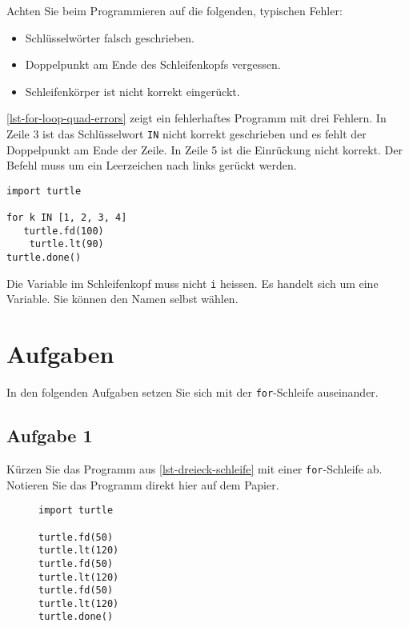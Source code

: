 Achten Sie beim Programmieren auf die folgenden, typischen Fehler:

\begin{itemize}
	\item Schlüsselwörter falsch geschrieben.
	\item Doppelpunkt am Ende des Schleifenkopfs vergessen.
	\item Schleifenkörper ist nicht korrekt eingerückt.
\end{itemize}
\autoref{lst-for-loop-quad-errors} zeigt ein fehlerhaftes Programm mit drei Fehlern. In Zeile 3 ist das Schlüsselwort \lstinline{IN} nicht korrekt geschrieben und es fehlt der Doppelpunkt am Ende der Zeile. In Zeile \num{5} ist die Einrückung nicht korrekt. Der Befehl muss um ein Leerzeichen nach links gerückt werden.

\begin{lstlisting}[caption={Fehlerhaftes Programm (\graybgtexttt{quadrat\_loop\_fehler.py}).}, label=lst-for-loop-quad-errors]
import turtle

for k IN [1, 2, 3, 4]
   turtle.fd(100)
    turtle.lt(90)
turtle.done()
\end{lstlisting}

\begin{hinweis}
Die Variable im Schleifenkopf muss nicht \lstinline{i} heissen. Es handelt sich um eine  Variable. Sie können den Namen selbst wählen.
\end{hinweis}

\section{Aufgaben}

In den folgenden Aufgaben setzen Sie sich mit der \lstinline{for}-Schleife auseinander.

\subsection{Aufgabe 1}

Kürzen Sie das Programm aus \autoref{lst-dreieck-schleife} mit einer \lstinline{for}-Schleife ab. Notieren Sie das Programm direkt hier auf dem Papier.

\begin{figure}[htb]
\centering
\begin{minipage}{0.6\textwidth}
\centering
\fillwithgrid{2in}
\end{minipage}
\hfill
\begin{minipage}{0.375\textwidth}
\centering
\begin{lstlisting}[caption={Gleichseitiges Dreieck.}, label=lst-dreieck-schleife]
import turtle

turtle.fd(50)
turtle.lt(120)
turtle.fd(50)
turtle.lt(120)
turtle.fd(50)
turtle.lt(120)
turtle.done()
\end{lstlisting}
\end{minipage}
\end{figure}

